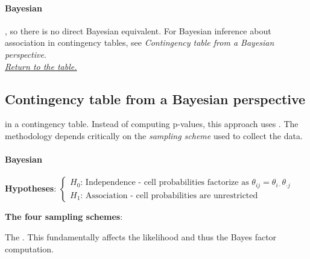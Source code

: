 \paragraph{Bayesian}
, so there is no direct Bayesian
equivalent. For Bayesian inference about association in contingency tables, see
\emph{Contingency table from a Bayesian perspective}. \\

\textit{\hyperref[statistical_method_table]{Return to the table.}}



\subsection{Contingency table from a Bayesian perspective}
 in a contingency table.
Instead of computing p-values, this approach uses . The methodology depends critically on
the \emph{sampling scheme} used to collect the data.

\paragraph{Bayesian}
\textbf{Hypotheses}:
$\begin{cases}
    H_{0}\text{: Independence - cell probabilities factorize as } \theta_{ij} = \theta_{i\cdot}\theta_{\cdot j} \\
    H_{1}\text{: Association - cell probabilities are unrestricted}
\end{cases}$

\textbf{The four sampling schemes}:

The .
This fundamentally affects the likelihood and thus the Bayes factor computation.

